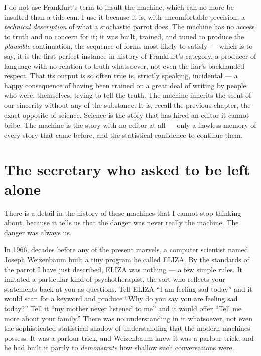 I do not use Frankfurt's term to insult the machine, which can no more be insulted than a tide can. I use it because it is, with uncomfortable precision, a \emph{technical description} of what a stochastic parrot does. The machine has no access to truth and no concern for it; it was built, trained, and tuned to produce the \emph{plausible} continuation, the sequence of forms most likely to satisfy — which is to say, it is the first perfect instance in history of Frankfurt's category, a producer of language with no relation to truth whatsoever, not even the liar's backhanded respect. That its output is so often true is, strictly speaking, incidental — a happy consequence of having been trained on a great deal of writing by people who were, themselves, trying to tell the truth. The machine inherits the scent of our sincerity without any of the substance. It is, recall the previous chapter, the exact opposite of science. Science is the story that has hired an editor it cannot bribe. The machine is the story with no editor at all — only a flawless memory of every story that came before, and the statistical confidence to continue them.

\section*{The secretary who asked to be left alone}

There is a detail in the history of these machines that I cannot stop thinking about, because it tells us that the danger was never really the machine. The danger was always us.

In 1966, decades before any of the present marvels, a computer scientist named Joseph Weizenbaum built a tiny program he called ELIZA. By the standards of the parrot I have just described, ELIZA was nothing — a few simple rules. It imitated a particular kind of psychotherapist, the sort who reflects your statements back at you as questions. Tell ELIZA ``I am feeling sad today'' and it would scan for a keyword and produce ``Why do you say you are feeling sad today?'' Tell it ``my mother never listened to me'' and it would offer ``Tell me more about your family.'' There was no understanding in it whatsoever, not even the sophisticated statistical shadow of understanding that the modern machines possess. It was a parlour trick, and Weizenbaum knew it was a parlour trick, and he had built it partly to \emph{demonstrate} how shallow such conversations were.

